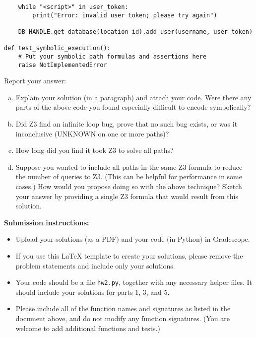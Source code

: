\documentclass{article}
\begin{document}
\begin{enumerate}
\begin{verbatim}
    while "<script>" in user_token:
        print("Error: invalid user token; please try again")

    DB_HANDLE.get_database(location_id).add_user(username, user_token)

def test_symbolic_execution():
    # Put your symbolic path formulas and assertions here
    raise NotImplementedError

\end{verbatim}

Report your answer:

\begin{enumerate}[(a)]
\item Explain your solution (in a paragraph) and attach your code. Were there any parts of the above code you found especially difficult to encode symbolically?
\item Did Z3 find an infinite loop bug, prove that no such bug exists, or was it inconclusive (UNKNOWN on one or more paths)?
\item How long did you find it took Z3 to solve all paths?
\item Suppose you wanted to include all paths in the same Z3 formula to reduce the number of queries to Z3.
(This can be helpful for performance in some cases.) How would you propose doing so with the above technique?
Sketch your answer by providing a single Z3 formula that would result from this solution.
\end{enumerate}

\end{enumerate}

\noindent
\textbf{Submission instructions:}
\begin{itemize}
\item Upload your solutions (as a PDF) and your code (in Python) in Gradescope.
\item If you use this LaTeX template to create your solutions, please remove the problem statements
and include only your solutions.
\item Your code should be a file \texttt{hw2.py}, together with any necessary helper files.
It should include your solutions for parts 1, 3, and 5.
\item Please include all of the function names and signatures as listed in the document above,
and do not modify any function signatures. (You are welcome to add additional functions and tests.)
\end{itemize}
\end{document}

